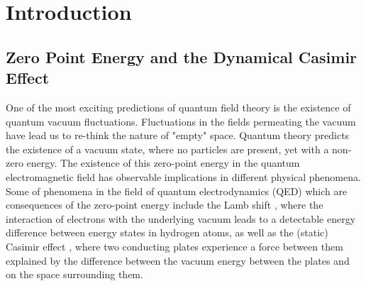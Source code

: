 \chapter{Introduction}

\section{Zero Point Energy and the Dynamical Casimir Effect}\label{sec:ZPE_and_DCE}

One of the most exciting predictions of quantum field theory is the existence of quantum vacuum fluctuations. Fluctuations in the fields permeating the vacuum have lead us to re-think the nature of "empty" space. Quantum theory predicts the existence of a vacuum state, where no particles are present, yet with a non-zero energy. The existence of this zero-point energy in the quantum electromagnetic field has observable implications in different physical phenomena. Some of phenomena in the field of quantum electrodynamics (QED) which are consequences of the zero-point energy include the Lamb shift \cite{Lamb1947}, where the interaction of electrons with the underlying vacuum leads to a detectable energy difference between energy states in hydrogen atoms, as well as the (static) Casimir effect \cite{Casimir1948}, where two conducting plates experience a force between them explained by the difference between the vacuum energy between the plates and on the space surrounding them. 

